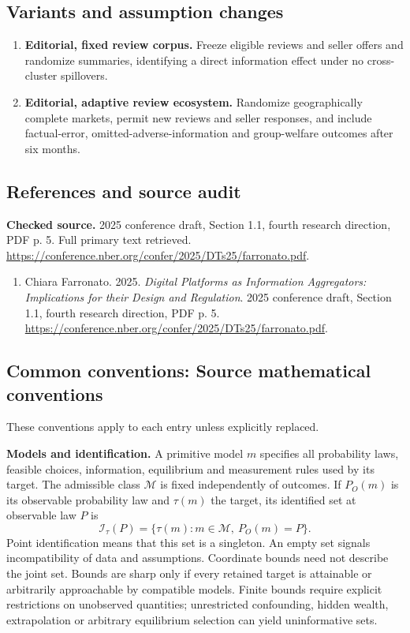 \documentclass[11pt,a4paper]{article}
\begin{document}
\subsection*{Variants and assumption changes}
\begin{enumerate}
\item \textbf{Editorial, fixed review corpus.} Freeze eligible reviews and seller offers and randomize summaries, identifying a direct information effect under no cross-cluster spillovers.
\item \textbf{Editorial, adaptive review ecosystem.} Randomize geographically complete markets, permit new reviews and seller responses, and include factual-error, omitted-adverse-information and group-welfare outcomes after six months.
\end{enumerate}
\subsection*{References and source audit}
\textbf{Checked source.} 2025 conference draft, Section 1.1, fourth research direction, PDF p. 5. Full primary text retrieved. \url{https://conference.nber.org/confer/2025/DTs25/farronato.pdf}.
\begin{enumerate}\raggedright
\item\hypertarget{definitions:source:30007685:1}{} Chiara Farronato. 2025. \emph{Digital Platforms as Information Aggregators: Implications for their Design and Regulation}. 2025 conference draft, Section 1.1, fourth research direction, PDF p. 5.
\url{https://conference.nber.org/confer/2025/DTs25/farronato.pdf}.
\end{enumerate}

\subsection*{Common conventions: Source mathematical conventions}

These conventions apply to each entry unless explicitly replaced.

\textbf{Models and identification.} A primitive model \(m\) specifies all probability laws, feasible choices, information, equilibrium and measurement rules used by its target. The admissible class \(\mathcal M\) is fixed independently of outcomes. If \(P_O(m)\) is its observable probability law and \(\tau(m)\) the target, its identified set at observable law \(P\) is
\[
 \mathcal I_\tau(P)=\{\tau(m):m\in\mathcal M,\ P_O(m)=P\}.
\]
Point identification means that this set is a singleton. An empty set signals incompatibility of data and assumptions. Coordinate bounds need not describe the joint set. Bounds are sharp only if every retained target is attainable or arbitrarily approachable by compatible models. Finite bounds require explicit restrictions on unobserved quantities; unrestricted confounding, hidden wealth, extrapolation or arbitrary equilibrium selection can yield uninformative sets.
\end{document}
